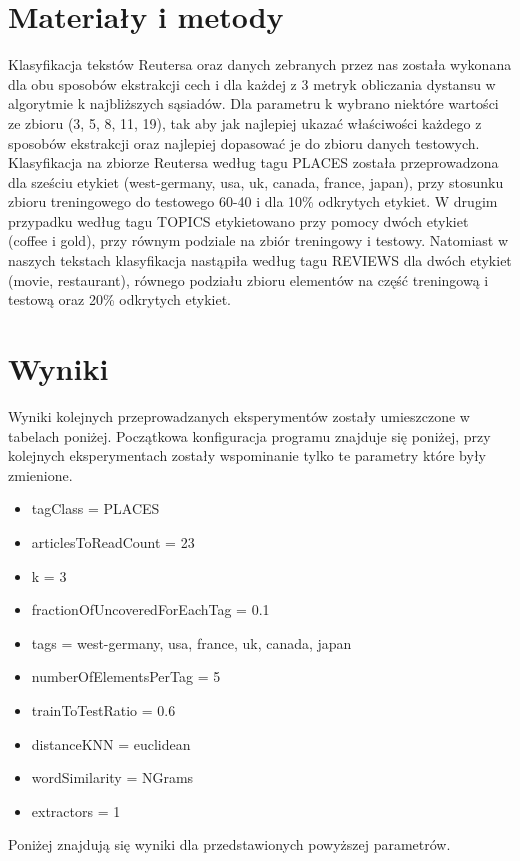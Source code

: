 \documentclass{classrep}
\begin{document}
\section{Materiały i metody}
Klasyfikacja tekstów Reutersa oraz danych zebranych przez nas została wykonana dla obu sposobów ekstrakcji cech i dla każdej z 3 metryk obliczania dystansu w algorytmie k najbliższych sąsiadów. Dla parametru k wybrano niektóre wartości ze zbioru (3, 5, 8, 11, 19), tak aby jak najlepiej ukazać właściwości każdego z sposobów ekstrakcji oraz najlepiej dopasować je do zbioru danych testowych. Klasyfikacja na zbiorze Reutersa według tagu PLACES została przeprowadzona dla sześciu etykiet (west-germany, usa, uk, canada, france, japan), przy stosunku zbioru treningowego do testowego 60-40 i dla 10\% odkrytych etykiet. W drugim przypadku według tagu TOPICS etykietowano przy pomocy dwóch etykiet (coffee i gold), przy równym podziale na zbiór treningowy i testowy. Natomiast w naszych tekstach klasyfikacja nastąpiła według tagu REVIEWS dla dwóch etykiet (movie, restaurant), równego podziału zbioru elementów na część treningową i testową oraz 20\% odkrytych etykiet.

\section{Wyniki}
Wyniki kolejnych przeprowadzanych eksperymentów zostały umieszczone w tabelach poniżej. Początkowa konfiguracja programu znajduje się poniżej, przy kolejnych eksperymentach zostały wspominanie tylko te parametry które były zmienione.
\begin{itemize}
	\item tagClass = PLACES
	\item articlesToReadCount = 23
	\item k = 3
	\item fractionOfUncoveredForEachTag = 0.1
	\item tags = west-germany, usa, france, uk, canada, japan
	\item numberOfElementsPerTag = 5
	\item trainToTestRatio = 0.6
	\item distanceKNN = euclidean
	\item wordSimilarity = NGrams
	\item extractors = 1
\end{itemize}
Poniżej znajdują się wyniki dla przedstawionych powyższej parametrów.\\
\end{document}
